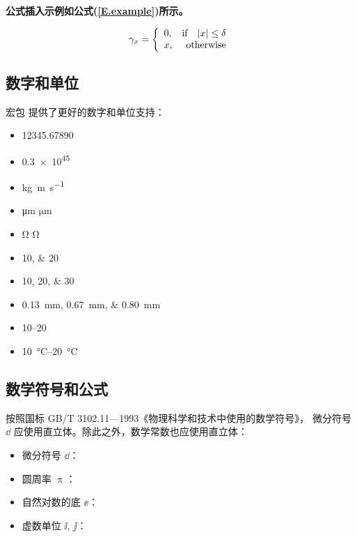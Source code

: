 \textbf{公式插入示例如公式(\ref{E.example})所示。}

\begin{equation}
\gamma_{x}=
\left\{
  \begin{array}{lr}
  0, & {\rm if}~~\;|x| \leq \delta \\
  x, & {\rm otherwise}
  \end{array}
\right.
\label{E.example}
\end{equation}

\subsection{数字和单位}

宏包  提供了更好的数字和单位支持：
\begin{itemize}
  \item \num{12345.67890}
  \item \num{.3e45}
  \item \si{kg.m.s^{-1}}
  \item \si{\micro\meter} $\si{\micro\meter}$
  \item \si{\ohm} $\si{\ohm}$
  \item \numlist{10;20}
  \item \numlist{10;20;30}
  \item \SIlist{0.13;0.67;0.80}{\milli\metre}
  \item \numrange{10}{20}
  \item \SIrange{10}{20}{\degreeCelsius}
\end{itemize}

\subsection{数学符号和公式}

按照国标 GB/T 3102.11—1993《物理科学和技术中使用的数学符号》，
微分符号 $\dd$ 应使用直立体。除此之外，数学常数也应使用直立体：
\begin{itemize}
  \item 微分符号 $\dd$：
  \item 圆周率 $\uppi$：
  \item 自然对数的底 $\ee$：
  \item 虚数单位 $\ii$, $\jj$： 
\end{itemize}

